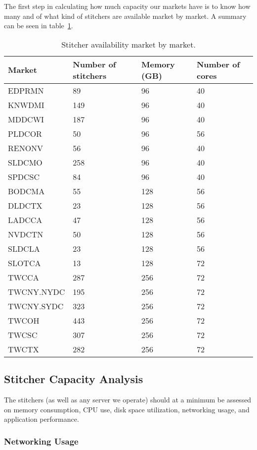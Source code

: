 \documentclass{article}
\begin{document}
The first step in calculating how much capacity our markets have is to know how many and of what kind of stitchers are available market by market. A summary can be seen in table~\ref{TABLE-marketStitcherAvail}.

\begin{table}
\begin{tabular}{|l|l|l|l|} 
\hline Market & Number of stitchers & Memory (GB) & Number of cores\\
\hline EDPRMN & 89 & 96 & 40\\
\hline KNWDMI & 149 & 96 & 40\\
\hline MDDCWI & 187 & 96 & 40\\
\hline PLDCOR & 50 & 96 & 56\\
\hline RENONV & 56 & 96 & 40\\
\hline SLDCMO & 258 & 96 & 40\\
\hline SPDCSC & 84 & 96 & 40\\
\hline BODCMA & 55 & 128 & 56\\
\hline DLDCTX & 23 & 128 & 56\\
\hline LADCCA & 47 & 128 & 56\\
\hline NVDCTN & 50 & 128 & 56\\
\hline SLDCLA & 23 & 128 & 56\\
\hline SLOTCA & 13 & 128 & 72\\
\hline TWCCA & 287 & 256 & 72\\
\hline TWCNY.NYDC & 195 & 256 & 72\\
\hline TWCNY.SYDC & 323 & 256 & 72\\
\hline TWCOH & 443 & 256 & 72\\
\hline TWCSC & 307 & 256 & 72\\
\hline TWCTX & 282 & 256 & 72\\
\hline 
\end{tabular}
\caption{\label{TABLE-marketStitcherAvail}Stitcher availability market by market.} 
\end{table}

\subsection{Stitcher Capacity Analysis}
\label{SECTION-StitcherCapacity}

The stitchers (as well as any server we operate) should at a minimum be assessed on memory consumption, CPU use, disk space utilization, networking usage, and application performance. 

\subsubsection{Networking Usage}
\label{SECTION-Networking}
\end{document}
